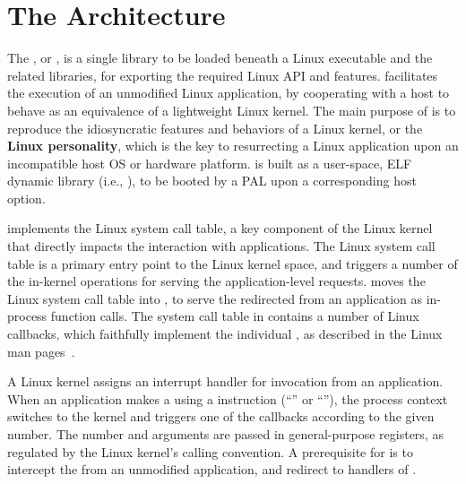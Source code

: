 \section{The \thelibos{} Architecture}


The \graphene{} \libos{}, or \thelibos{},
is a single library to be loaded beneath a Linux executable and the related libraries,
for exporting the required Linux API and features.
\thelibos{} facilitates the execution of an unmodified Linux application,
by cooperating with a host to behave as an equivalence of a lightweight Linux kernel. 
The main purpose of \thelibos{} is to reproduce
the idiosyncratic features and behaviors of a Linux kernel,
or the {\bf Linux personality},
which is the key to resurrecting a Linux application upon an incompatible
host OS or hardware platform.
\thelibos{} is built as a user-space, ELF dynamic library (i.e., ),
to be booted by a PAL upon a corresponding
host option.


\thelibos{} implements the Linux system call table,
a key component of the Linux kernel that directly impacts the interaction with applications. 
The Linux system call table is
a primary entry point to the Linux kernel space,
and triggers a number of the in-kernel operations for serving the application-level requests.
\graphene{} moves the Linux system call table into \thelibos{},
to serve the redirected \linuxapis{} from an application as in-process function calls.
The system call table in \thelibos{} contains a number of
Linux \linuxapi{} callbacks,
which faithfully implement the individual \linuxapis{}, as described
in the Linux man pages~\cite{linux-man-syscall}.


A Linux kernel assigns
an interrupt handler for \linuxapi{} invocation from an application.
When an application makes a \linuxapi{} using a \graphenearch{} instruction (``'' or ``''),
the process
context switches to the kernel
and triggers one of the \linuxapi{} callbacks according to the given \linuxapi{} number.
The \linuxapi{} number and arguments
are passed in \graphenearch{} general-purpose registers, as regulated by the Linux kernel's calling convention.
A prerequisite for \thelibos{}
is to intercept the \linuxapis{} from an unmodified application,
and redirect %
to \linuxapi{} handlers of \thelibos{}.


